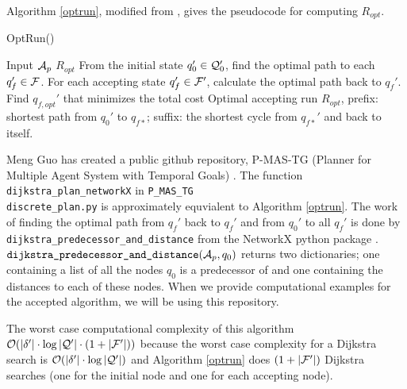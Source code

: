 Algorithm \ref{optrun}, modified from \cite{guo15}, gives the pseudocode for computing $R_{opt}$.
\begin{algorithm}
\caption{OptRun()}\label{optrun}
\begin{algorithmic}[1]
\Require Input $\mathcal{A}_p$
\Ensure $R_{opt}$
\State From the initial state $q_0' \in \mathcal{Q}_0'$, find the optimal path to each $q_f' \in \mathcal{F}$.
\State For each accepting state $q_f' \in \mathcal{F}'$, calculate the optimal path back to $q_f'$. 
\State Find $q_{f,opt}'$ that minimizes the total cost
\State Optimal accepting run $R_{opt}$, prefix: shortest path from $q_{0}'$ to  $q_{f*}$; suffix: the shortest cycle from $q_{f*}'$ and back to itself.
\end{algorithmic}
\end{algorithm}

Meng Guo has created a public github repository, P-MAS-TG (Planner for Multiple Agent System with Temporal Goals) \cite{pMasGit}. The function \texttt{dijkstra\_plan\_networkX} in \texttt{P\_MAS\_TG\\discrete\_plan.py} is approximately equvialent to Algorithm \ref{optrun}. The work of finding the optimal path from $q_f'$ back to $q_f'$ and from $q_0'$ to all $q_f'$ is done by \texttt{dijkstra\_predecessor\_and\_distance} from the NetworkX python package \cite{schult08}. $\texttt{dijkstra\_predecessor\_and\_distance}(\mathcal{A}_p,q_0)$ returns two dictionaries; one containing a list of all the nodes $q_0$ is a predecessor of and one containing the distances to each of these nodes. When we provide computational examples for the accepted algorithm, we will be using this repository. %


The worst case computational complexity of this algorithm $\mathcal{O}(|\delta'| \cdot \log|\mathcal{Q}'| \cdot (1 + |\mathcal{F}'|))$ because the worst case complexity for a Dijkstra search is $\mathcal{O}(|\delta'| \cdot \log|\mathcal{Q}'| )$ and Algorithm \ref{optrun} does $(1+ |\mathcal{F}'|)$ Dijkstra searches (one for the initial node and one for each accepting node).

